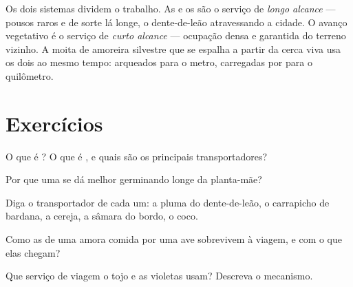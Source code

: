 \begin{remark}\label{rem:g6:how-plants-spread:twospeeds}
Os dois sistemas dividem o trabalho. As  e os  são o
serviço de \emph{longo alcance} --- pousos raros e de sorte lá longe,
o dente-de-leão atravessando a cidade. O avanço vegetativo é o
serviço de \emph{curto alcance} --- ocupação densa e garantida do
terreno vizinho. A moita de amoreira silvestre que se espalha a partir
da cerca viva usa os dois ao mesmo tempo:  arqueados para o
metro,  carregadas por  para o quilômetro.
\end{remark}

\section{Exercícios}

\begin{exercise}[$\star$]\label{exo:g6:how-plants-spread:1}
O que é ? O que é , e quais são os principais
transportadores?
\end{exercise}

\begin{exercise}[$\star$]\label{exo:g6:how-plants-spread:2}
Por que uma  se dá melhor germinando longe da planta-mãe?
\end{exercise}

\begin{exercise}[$\star$]\label{exo:g6:how-plants-spread:3}
Diga o transportador de cada um: a pluma do dente-de-leão, o
carrapicho de bardana, a cereja, a sâmara do bordo, o coco.
\end{exercise}

\begin{exercise}[$\star$]\label{exo:g6:how-plants-spread:4}
Como as  de uma amora comida por uma ave sobrevivem à viagem,
e com o que elas chegam?
\end{exercise}

\begin{exercise}[$\star$]\label{exo:g6:how-plants-spread:5}
Que serviço de viagem o tojo e as violetas usam? Descreva o
mecanismo.
\end{exercise}

